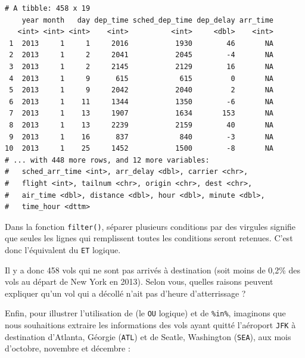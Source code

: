 \documentclass[a4paperpaper,]{article}
\newenvironment{Shaded}{\begin{snugshade}}{\end{snugshade}}
\newcommand{\DecValTok}[1]{\textcolor[rgb]{0.69,0.50,0.00}{#1}}
\newcommand{\KeywordTok}[1]{\textcolor[rgb]{0.12,0.11,0.11}{\textbf{#1}}}
\newcommand{\NormalTok}[1]{\textcolor[rgb]{0.12,0.11,0.11}{#1}}
\newcommand{\OperatorTok}[1]{\textcolor[rgb]{0.12,0.11,0.11}{#1}}
\newcommand{\StringTok}[1]{\textcolor[rgb]{0.75,0.01,0.01}{#1}}
\begin{document}
\begin{verbatim}
# A tibble: 458 x 19
    year month   day dep_time sched_dep_time dep_delay arr_time
   <int> <int> <int>    <int>          <int>     <dbl>    <int>
 1  2013     1     1     2016           1930        46       NA
 2  2013     1     2     2041           2045        -4       NA
 3  2013     1     2     2145           2129        16       NA
 4  2013     1     9      615            615         0       NA
 5  2013     1     9     2042           2040         2       NA
 6  2013     1    11     1344           1350        -6       NA
 7  2013     1    13     1907           1634       153       NA
 8  2013     1    13     2239           2159        40       NA
 9  2013     1    16      837            840        -3       NA
10  2013     1    25     1452           1500        -8       NA
# ... with 448 more rows, and 12 more variables:
#   sched_arr_time <int>, arr_delay <dbl>, carrier <chr>,
#   flight <int>, tailnum <chr>, origin <chr>, dest <chr>,
#   air_time <dbl>, distance <dbl>, hour <dbl>, minute <dbl>,
#   time_hour <dttm>
\end{verbatim}

Dans la fonction \texttt{filter()}, séparer plusieurs conditions par des virgules signifie que seules les lignes qui remplissent toutes les conditions seront retenues. C'est donc l'équivalent du \texttt{ET} logique.

Il y a donc 458 vols qui ne sont pas arrivés à destination (soit moins de 0,2\% des vols au départ de New York en 2013). Selon vous, quelles raisons peuvent expliquer qu'un vol qui a décollé n'ait pas d'heure d'atterrissage ?

Enfin, pour illustrer l'utilisation de \texttt{\textbar{}} (le \texttt{OU} logique) et de \texttt{\%in\%}, imaginons que nous souhaitions extraire les informations des vols ayant quitté l'aéroport \texttt{JFK} à destination d'Atlanta, Géorgie (\texttt{ATL}) et de Seatle, Washington (\texttt{SEA}), aux mois d'octobre, novembre et décembre :

\begin{Shaded}
\end{Shaded}
\end{document}
